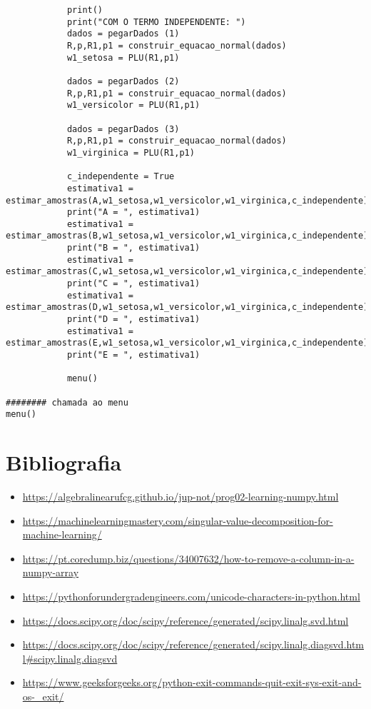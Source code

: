 \documentclass[a4paper,12pt,twoside]{article}
\begin{document}
\begin{lstlisting}
            print()
            print("COM O TERMO INDEPENDENTE: ")
            dados = pegarDados (1)
            R,p,R1,p1 = construir_equacao_normal(dados)
            w1_setosa = PLU(R1,p1)
            
            dados = pegarDados (2)
            R,p,R1,p1 = construir_equacao_normal(dados)
            w1_versicolor = PLU(R1,p1)
            
            dados = pegarDados (3)
            R,p,R1,p1 = construir_equacao_normal(dados)
            w1_virginica = PLU(R1,p1)
            
            c_independente = True
            estimativa1 = estimar_amostras(A,w1_setosa,w1_versicolor,w1_virginica,c_independente)
            print("A = ", estimativa1)
            estimativa1 = estimar_amostras(B,w1_setosa,w1_versicolor,w1_virginica,c_independente)
            print("B = ", estimativa1)
            estimativa1 = estimar_amostras(C,w1_setosa,w1_versicolor,w1_virginica,c_independente)
            print("C = ", estimativa1)
            estimativa1 = estimar_amostras(D,w1_setosa,w1_versicolor,w1_virginica,c_independente)
            print("D = ", estimativa1)
            estimativa1 = estimar_amostras(E,w1_setosa,w1_versicolor,w1_virginica,c_independente)
            print("E = ", estimativa1)
            
            menu()
                       
######## chamada ao menu
menu()
\end{lstlisting}



\section{Bibliografia}
\begin{itemize}
   \item \url{https://algebralinearufcg.github.io/jup-not/prog02-learning-numpy.html}
   \item \url{https://machinelearningmastery.com/singular-value-decomposition-for-machine-learning/}
   \item \url{https://pt.coredump.biz/questions/34007632/how-to-remove-a-column-in-a-numpy-array}
   \item \url{https://pythonforundergradengineers.com/unicode-characters-in-python.html}
   \item \url{https://docs.scipy.org/doc/scipy/reference/generated/scipy.linalg.svd.html}
   \item \url{https://docs.scipy.org/doc/scipy/reference/generated/scipy.linalg.diagsvd.html#scipy.linalg.diagsvd}
   \item \url{https://www.geeksforgeeks.org/python-exit-commands-quit-exit-sys-exit-and-os-_exit/}
 \end{itemize}
\end{document}
